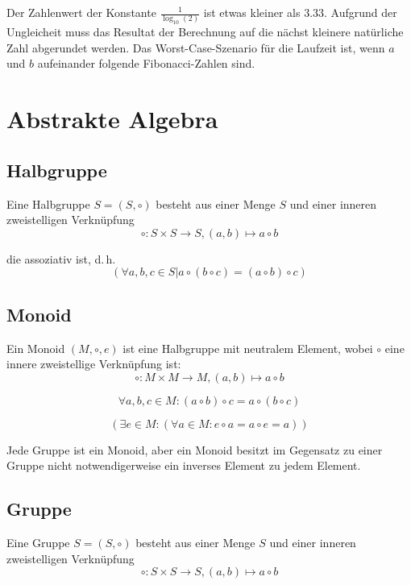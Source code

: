 \documentclass[a4paper, ngerman, landscape, fleqn]{article}
\begin{document}
\begin{multicols*}{3}
Der Zahlenwert der Konstante $\frac{1}{\log_{10}(2)}$ ist etwas kleiner als 3.33. Aufgrund der Ungleicheit muss das Resultat der Berechnung auf die nächst kleinere natürliche Zahl abgerundet werden.
Das Worst-Case-Szenario für die Laufzeit ist, wenn $a$ und $b$ aufeinander folgende Fibonacci-Zahlen sind.

\section*{Abstrakte Algebra}

\subsection*{Halbgruppe}
Eine Halbgruppe $S = (S, \circ)$ besteht aus einer Menge $S$ und einer inneren zweistelligen Verknüpfung 
\begin{equation*}
    \circ : S \times S \rightarrow S, (a, b) \mapsto a \circ b
\end{equation*}

die assoziativ ist, d.\,h.
\begin{equation*}
    (\forall a, b, c \in S | a \circ (b \circ c) = (a \circ b) \circ c)
\end{equation*}

\subsection*{Monoid}

Ein Monoid $(M, \circ, e)$ ist eine Halbgruppe mit neutralem Element, wobei $\circ$ eine innere zweistellige Verknüpfung ist:
\begin{equation*}
    \circ : M \times M \rightarrow M, (a, b) \mapsto a \circ b
\end{equation*}

\begin{equation*}
    \forall a, b, c \in M : (a \circ b) \circ c = a \circ (b \circ c)
\end{equation*}

\begin{equation*}
    (\exists e \in M : (\forall a \in M : e \circ a = a \circ e = a))
\end{equation*}

Jede Gruppe ist ein Monoid, aber ein Monoid besitzt im Gegensatz zu einer Gruppe nicht notwendigerweise ein inverses Element zu jedem Element.

\subsection*{Gruppe}
Eine Gruppe $S = (S, \circ)$ besteht aus einer Menge $S$ und einer inneren zweistelligen Verknüpfung
\begin{equation*}
    \circ : S \times S \rightarrow S, (a, b) \mapsto a \circ b
\end{equation*}


\end{multicols*}
\end{document}
